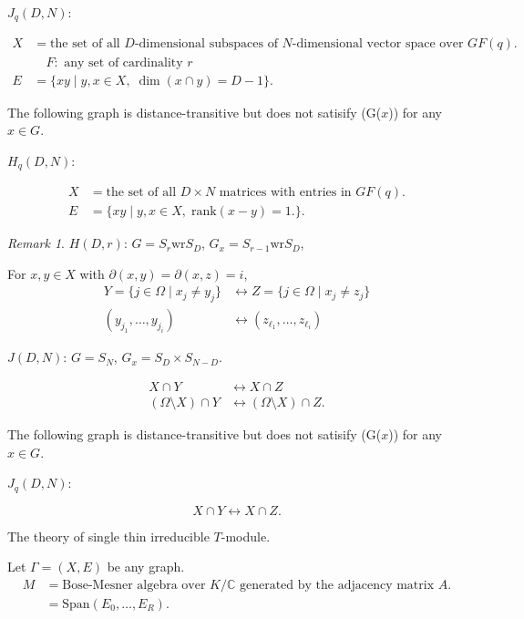 \documentclass[
]{book}
\theoremstyle{definition}
\theoremstyle{definition}
\theoremstyle{definition}
\theoremstyle{definition}
\theoremstyle{remark}
\newtheorem*{remark}{Remark}
\begin{document}
\(J_q(D, N)\):

\begin{align}
X & = \text{the set of all $D$-dimensional subspaces of $N$-dimensional vector space over $GF(q)$.}\\
& \quad F: \text{ any set of cardinality $r$}\\
E & = \{xy\mid y, x\in X, \; \dim (x\cap y) = D-1\}.
\end{align}

The following graph is distance-transitive but does not satisify (G(\(x\))) for any \(x\in G\).

\(H_q(D,N)\):

\begin{align}
X & = \text{the set of all $D\times N$ matrices with entries in $GF(q)$}.\\
E & = \{xy\mid y, x\in X, \; \mathrm{rank}(x-y) = 1.\}.
\end{align}

\begin{remark}
\leavevmode

\(H(D,r)\): \(G = S_r \mathrm{wr} S_D\), \(G_x = S_{r-1} \mathrm{wr} S_D\),

For \(x, y\in X\) with \(\partial(x, y) = \partial(x,z) = i\),
\begin{align}
Y = \{j\in \Omega \mid x_j\neq y_j\} & \leftrightarrow Z = \{j\in \Omega \mid x_j\neq z_j\}\\
(y_{j_1}, \ldots, y_{j_i}) & \leftrightarrow (z_{\ell_1}, \ldots, z_{\ell_i})
\end{align}

\(J(D, N)\): \(G = S_N\), \(G_x = S_D \times S_{N-D}\).

\begin{align}
X\cap Y & \leftrightarrow X \cap Z\\
(\Omega \setminus X)\cap Y & \leftrightarrow (\Omega \setminus X)\cap Z.
\end{align}

The following graph is distance-transitive but does not satisify (G(\(x\))) for any \(x\in G\).

\(J_q(D,N)\):

\[X\cap Y  \leftrightarrow X \cap Z.\]

\end{remark}

The theory of single thin irreducible \(T\)-module.

Let \(\Gamma = (X, E)\) be any graph.
\begin{align}
M & = \text{Bose-Mesner algebra over $K/\mathbb{C}$ generated by the adjacency matrix $A$.}\\
& = \mathrm{Span}(E_0, \ldots, E_R).
\end{align}
\end{document}
